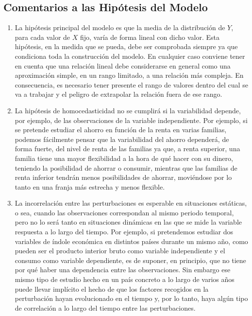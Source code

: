 \documentclass[10pt,a4paper]{book}
\begin{document}
\subsection{Comentarios a las Hipótesis del Modelo}
\begin{enumerate}
\item La hipótesis principal del modelo es que la media de la distribución de $Y$, para cada valor de $X$ fijo, varía de forma lineal con dicho valor. Esta hipótesis, en la medida que se pueda, debe ser comprobada siempre ya que condiciona toda la construcción del modelo. En cualquier caso conviene tener en cuenta que una relación lineal debe considerarse en general como una aproximación simple, en un rango limitado, a una relación más compleja. En consecuencia, es necesario tener presente el rango de valores dentro del cual se va a trabajar y el peligro de extrapolar la relación fuera de ese rango.
\item La hipótesis de homocedasticidad no se cumplirá si la variabilidad depende, por ejemplo, de las observaciones de la variable independiente. Por ejemplo, si se pretende estudiar el ahorro en función de la renta en varias familias, podemos fácilmente pensar que la variabilidad del ahorro dependerá, de forma fuerte, del nivel de renta de las familias ya que, a renta superior, una familia tiene una mayor flexibilidad a la hora de qué hacer con su dinero, teniendo la posibilidad de ahorrar o consumir, mientras que las familias de renta inferior tendrán menos posibilidades de ahorrar, moviéndose por lo tanto en una franja más estrecha y menos flexible.
\item La incorrelación entre las perturbaciones es esperable en situaciones estáticas, o sea, cuando las observaciones
correspondan al mismo periodo temporal, pero no lo será tanto en situaciones dinámicas
en las que se mide la variable respuesta a lo largo del tiempo. Por ejemplo, si pretendemos estudiar dos variables de índole económica en distintos países durante un mismo año, como pueden ser el producto interior bruto como variable independiente y el consumo como variable dependiente, es de suponer, en principio, que no tiene por qué haber una dependencia entre las observaciones. Sin embargo ese mismo tipo de estudio hecho en un país concreto a lo largo de varios años puede llevar implícito el hecho de que los factores recogidos en la perturbación hayan evolucionado en el tiempo y, por lo tanto, haya algún tipo de correlación a lo largo del tiempo entre las perturbaciones.
\end{enumerate}
\end{document}
